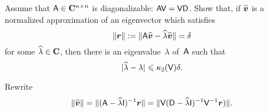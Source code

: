 \begin{exercise}
    \label{exercise:a_posteriori_2}
    Assume that $\mathsf A \in \mathbf C^{n \times n}$ is diagonalizable: $\mathsf A \mathsf V = \mathsf V \mathsf D$.
    Show that, if $\widehat {\mathbf{\boldsymbol{v}}}$ is a normalized approximation of an eigenvector which satisfies
    \[
        \lVert\mathbf{\boldsymbol{r}}\rVert :=  \lVert\mathsf A \widehat {\mathbf{\boldsymbol{v}}} - \widehat \lambda \widehat {\mathbf{\boldsymbol{v}}}\rVert = \delta
    \]
    for some $\widehat \lambda \in \mathbf C$,
    then there is an eigenvalue~$\lambda$ of~$\mathsf A$ such that
    \[
        \lvert\widehat \lambda - \lambda\rvert \leqslant \kappa_2(\mathsf V) \delta.
    \]

    Rewrite
    \[
        \lVert\widehat {\mathbf{\boldsymbol{v}}}\rVert = \lVert(\mathsf A - \widehat \lambda \mathsf I)^{-1}  {\mathbf{\boldsymbol{r}}}\rVert
        = \lVert\mathsf V (\mathsf D - \widehat \lambda \mathsf I)^{-1}  \mathsf V^{-1} {\mathbf{\boldsymbol{r}}})\rVert.
    \]
\end{exercise}

